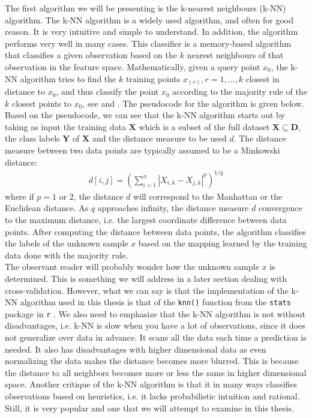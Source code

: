 \documentclass[../thesis.tex]{subfiles}
\begin{document}
\noindent The first algorithm we will be presenting is the k-nearest neighbours (k-NN) algorithm. The k-NN algorithm \citep{fix1951discriminatory} is a widely used algorithm, and often for good reason. It is very intuitive and simple to understand. In addition, the algorithm performs very well in many cases. This classifier is a memory-based algorithm that classifies a given observation based on the $k$ nearest neighbours of that observation in the feature space. Mathematically, given a query point $x_0$, the k-NN algorithm tries to find the $k$ training points $x_{(r)}, r = 1, \hdots, k$ closest in distance to $x_0$, and thus classify the point $x_0$ according to the majority rule of the $k$ closest points to $x_0$, see \citep{friedman2009elements} and \citep{james2013introduction}. The pseudocode for the algorithm is given below. Based on the pseudocode, we can see that the k-NN algorithm starts out by taking as input the training data $\mathbf{X}$ which is a subset of the full dataset ${\displaystyle \mathbf{X}\subseteq \mathbf{D}}$, the class labels $\mathbf{Y}$ of $\mathbf{X}$ and the distance measure to be used $d$. The distance measure between two data points are typically assumed to be a Minkowski distance:
\begin{align}
    d[i,j] = \left(\sum_{i=1}^n |X_{i, k} - X_{j, k}|^p\right)^{1/q}
\end{align}
where if $p=1$ or 2, the distance $d$ will correspond to the Manhattan or the Euclidean distance. As $q$ approaches infinity, the distance measure $d$ convergence to the maximum distance, i.e. the largest coordinate difference between data points. After computing the distance between data points, the algorithm classifies the labels of the unknown sample $x$ based on the mapping learned by the training data done with the majority rule.\\
\indent The observant reader will probably wonder how the unknown sample $x$ is determined. This is something we will address in a later section dealing with cross-validation. However, what we can say is that the implementation of the k-NN algorithm used in this thesis is that of the \texttt{knn()} function from the \texttt{stats} package in \texttt{r} \citep{stats}. We also need to emphasize that the k-NN algorithm is not without disadvantages, i.e.  k-NN is slow when you have a lot of observations, since it does not generalize over data in advance. It scans all the data each time a prediction is needed. It also has disadvantages with higher dimensional data as even normalizing the data makes the distance becomes more blurred. This is because the distance to all neighbors becomes more or less the same in higher dimensional space. Another critique of the k-NN algorithm is that it in many ways classifies observations based on heuristics, i.e. it lacks probabilistic intuition and rational. Still, it is very popular and one that we will attempt to examine in this thesis.\\
\end{document}
